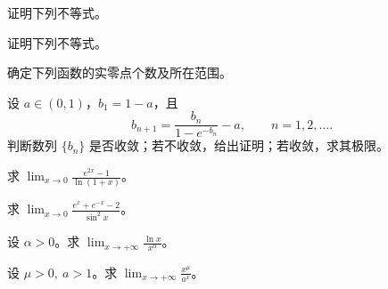 \newpage
\noindent\begin{minipage}{\textwidth}
证明下列不等式。
\end{minipage}\par\vfill
\noindent\begin{minipage}{\textwidth}
证明下列不等式。
\end{minipage}\par\vfill
\noindent\begin{minipage}{\textwidth}
确定下列函数的实零点个数及所在范围。
\end{minipage}\par\vfill
\noindent\begin{minipage}{\textwidth}
设 $a\in(0,1)$，$b_1=1-a$，且\[b_{n+1}=\frac{b_n}{1-e^{-b_n}}-a,\qquad n=1,2,\ldots.\]判断数列 $\{b_n\}$ 是否收敛；若不收敛，给出证明；若收敛，求其极限。
\end{minipage}\par\vfill
\newpage
\noindent\begin{minipage}{\textwidth}
求 $\displaystyle\lim_{x\to0}\frac{e^{2x}-1}{\ln(1+x)}$。
\end{minipage}\par\vfill
\noindent\begin{minipage}{\textwidth}
求 $\displaystyle\lim_{x\to0}\frac{e^x+e^{-x}-2}{\sin^2x}$。
\end{minipage}\par\vfill
\noindent\begin{minipage}{\textwidth}
设 $\alpha>0$。求 $\displaystyle\lim_{x\to+\infty}\frac{\ln x}{x^\alpha}$。
\end{minipage}\par\vfill
\noindent\begin{minipage}{\textwidth}
设 $\mu>0,\ a>1$。求 $\displaystyle\lim_{x\to+\infty}\frac{x^\mu}{a^x}$。
\end{minipage}\par\vfill
